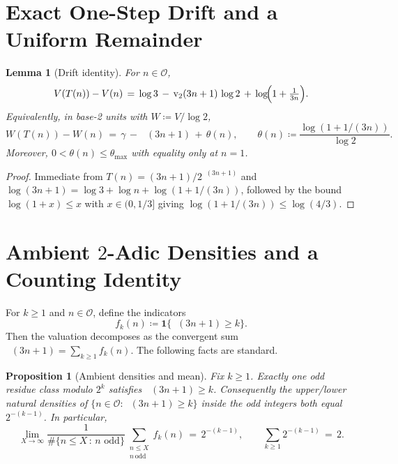 \documentclass[11pt]{article}
\theoremstyle{plain}
\newtheorem{lemma}[theorem]{Lemma}
\newtheorem{proposition}[theorem]{Proposition}
\theoremstyle{definition}
\theoremstyle{remark}
\DeclareMathOperator{\vtwo}{v_2}
\newcommand{\Odd}{\mathcal{O}} %
\newcommand{\Todd}{T} %
\newcommand{\V}{V}
\newcommand{\W}{W}
\newcommand{\1}{\mathbf{1}}
\begin{document}
\section{Exact One-Step Drift and a Uniform Remainder}
\begin{lemma}[Drift identity]
For $n\in\Odd$,
\begin{equation}\label{eq:drift}
  \V(\Todd(n)) - \V(n) 
  \,=\, \log 3 \, -\, \vtwo(3n+1)\,\log 2 \, +\, \log\!\Bigl(1+\tfrac{1}{3n}\Bigr).
\end{equation}
Equivalently, in base-2 units with $\W\coloneqq \V/\log 2$,
\begin{equation}\label{eq:drift-base2}
  \W(\Todd(n)) - \W(n)
  \,=\, \gamma \, -\, \vtwo(3n+1) \, +\, \theta(n),\qquad \theta(n)\coloneqq \frac{\log(1+1/(3n))}{\log 2}.
\end{equation}
Moreover, $0<\theta(n)\le \theta_{\max}$ with equality only at $n=1$.
\end{lemma}
\begin{proof}
Immediate from $\Todd(n)=(3n+1)/2^{\vtwo(3n+1)}$ and $\log(3n+1)=\log 3+\log n+\log(1+1/(3n))$, followed by the bound $\log(1+x)\le x$ with $x\in(0,1/3]$ giving $\log(1+1/(3n))\le\log(4/3)$.
\end{proof}

\section{Ambient $2$-Adic Densities and a Counting Identity}
For $k\ge1$ and $n\in\Odd$, define the indicators
\begin{equation}
  f_k(n) \coloneqq \1\{\vtwo(3n+1)\ge k\} .
\end{equation}
Then the valuation decomposes as the convergent sum $\vtwo(3n+1)=\sum_{k\ge1} f_k(n)$. The following facts are standard.

\begin{proposition}[Ambient densities and mean]
Fix $k\ge1$. Exactly one odd residue class modulo $2^k$ satisfies $\vtwo(3n+1)\ge k$. Consequently the upper/lower natural densities of $\{n\in\Odd: \vtwo(3n+1)\ge k\}$ inside the odd integers both equal $2^{-(k-1)}$. In particular,
\begin{equation}
  \lim_{X\to\infty} \frac{1}{\#\{n\le X\,:\, n\text{ odd}\}} \sum_{\substack{n\le X\\ n\,\text{odd}}} f_k(n) \,=\, 2^{-(k-1)},\qquad \sum_{k\ge1} 2^{-(k-1)} \,=\, 2.
\end{equation}
\end{proposition}
\end{document}
